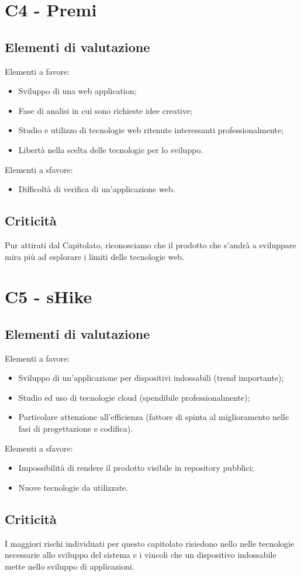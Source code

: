 \section{C4 - Premi}{
	\subsection{Elementi di valutazione}{
		Elementi a favore:
		\begin{itemize}
			\item Sviluppo di una web application;
			\item Fase di analisi in cui sono richieste idee creative;
			\item Studio e utilizzo di tecnologie web ritenute interessanti professionalmente;
			\item Libertà nella scelta delle tecnologie per lo sviluppo.
		\end{itemize}
		
		Elementi a sfavore:
		\begin{itemize}
			\item Difficoltà di verifica di un'applicazione web.
		\end{itemize}
	}
	\subsection{Criticità}{
		Pur attirati dal Capitolato, riconosciamo che il prodotto che s'andrà a sviluppare mira più ad esplorare i limiti delle tecnologie web.
	}
}
\section{C5 - sHike}{
	\subsection{Elementi di valutazione}{
		Elementi a favore:
		\begin{itemize}
			\item Sviluppo di un'applicazione per dispositivi indossabili (trend importante);
			\item Studio ed uso di tecnologie cloud (spendibile professionalmente);
			\item Particolare attenzione all'efficienza (fattore di spinta al miglioramento nelle fasi di progettazione e codifica).
		\end{itemize}
		
		Elementi a sfavore:
		\begin{itemize}
			\item Impossibilità di rendere il prodotto visibile in repository pubblici;
			\item Nuove tecnologie da utilizzate.
		\end{itemize}
	}
	\subsection{Criticità}{
		I maggiori rischi individuati per questo capitolato risiedono nello nelle tecnologie necessarie allo sviluppo del sistema e i vincoli che un dispositivo indossabile mette nello sviluppo di applicazioni. 
	}
}